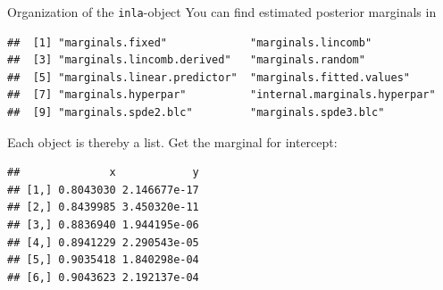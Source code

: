 \documentclass[
  ignorenonframetext,
]{beamer}
\newenvironment{Shaded}{\begin{snugshade}}{\end{snugshade}}
\newcommand{\DecValTok}[1]{\textcolor[rgb]{0.00,0.00,0.81}{#1}}
\newcommand{\FunctionTok}[1]{\textcolor[rgb]{0.00,0.00,0.00}{#1}}
\newcommand{\NormalTok}[1]{#1}
\newcommand{\SpecialCharTok}[1]{\textcolor[rgb]{0.00,0.00,0.00}{#1}}
\begin{document}
\begin{frame}[fragile]{Organization of the \texttt{inla}-object}
\protect\hypertarget{organization-of-the-inla-object-2}{}
You can find estimated posterior marginals in \small

\begin{verbatim}
##  [1] "marginals.fixed"             "marginals.lincomb"          
##  [3] "marginals.lincomb.derived"   "marginals.random"           
##  [5] "marginals.linear.predictor"  "marginals.fitted.values"    
##  [7] "marginals.hyperpar"          "internal.marginals.hyperpar"
##  [9] "marginals.spde2.blc"         "marginals.spde3.blc"
\end{verbatim}

\normalsize

Each object is thereby a list. Get the marginal for intercept:

\scriptsize

\begin{Shaded}
\end{Shaded}

\begin{verbatim}
##              x            y
## [1,] 0.8043030 2.146677e-17
## [2,] 0.8439985 3.450320e-11
## [3,] 0.8836940 1.944195e-06
## [4,] 0.8941229 2.290543e-05
## [5,] 0.9035418 1.840298e-04
## [6,] 0.9043623 2.192137e-04
\end{verbatim}

\normalsize
\end{frame}
\end{document}
